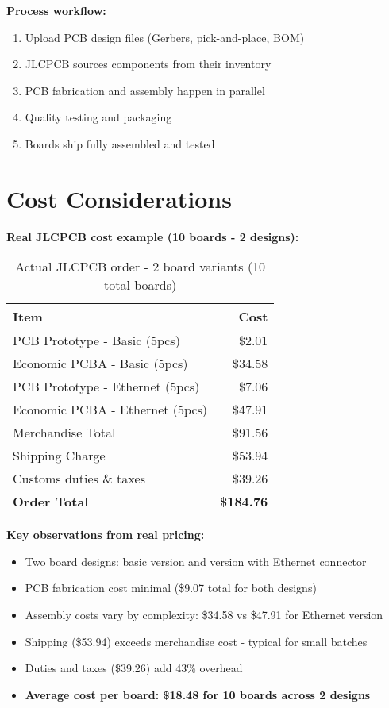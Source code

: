 \textbf{Process workflow:}
\begin{enumerate}
\item Upload PCB design files (Gerbers, pick-and-place, BOM)
\item JLCPCB sources components from their inventory
\item PCB fabrication and assembly happen in parallel
\item Quality testing and packaging
\item Boards ship fully assembled and tested
\end{enumerate}

\section{Cost Considerations}

\textbf{Real JLCPCB cost example (10 boards - 2 designs):}

\begin{table}[h]
\centering
\begin{tabular}{|l|r|}
\hline
\textbf{Item} & \textbf{Cost} \\
\hline
PCB Prototype - Basic (5pcs) & \$2.01 \\
Economic PCBA - Basic (5pcs) & \$34.58 \\
PCB Prototype - Ethernet (5pcs) & \$7.06 \\
Economic PCBA - Ethernet (5pcs) & \$47.91 \\
\hline
Merchandise Total & \$91.56 \\
Shipping Charge & \$53.94 \\
Customs duties \& taxes & \$39.26 \\
\hline
\textbf{Order Total} & \textbf{\$184.76} \\
\hline
\end{tabular}
\caption{Actual JLCPCB order - 2 board variants (10 total boards)}
\end{table}

\textbf{Key observations from real pricing:}
\begin{itemize}
\item Two board designs: basic version and version with Ethernet connector
\item PCB fabrication cost minimal (\$9.07 total for both designs)
\item Assembly costs vary by complexity: \$34.58 vs \$47.91 for Ethernet version
\item Shipping (\$53.94) exceeds merchandise cost - typical for small batches
\item Duties and taxes (\$39.26) add 43\% overhead
\item \textbf{Average cost per board: \$18.48 for 10 boards across 2 designs}
\end{itemize}

